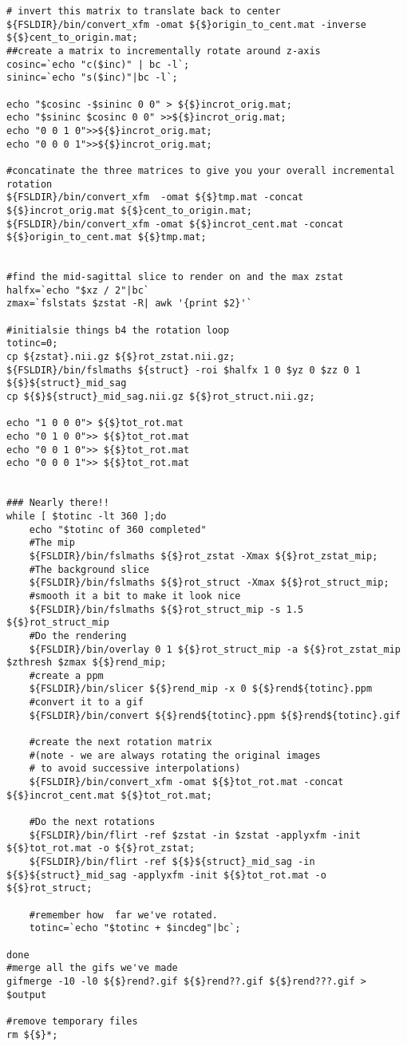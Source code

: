 \documentclass{jsarticle}
\begin{document}
\begin{verbatim}
# invert this matrix to translate back to center
${FSLDIR}/bin/convert_xfm -omat ${$}origin_to_cent.mat -inverse ${$}cent_to_origin.mat;
##create a matrix to incrementally rotate around z-axis
cosinc=`echo "c($inc)" | bc -l`;
sininc=`echo "s($inc)"|bc -l`;

echo "$cosinc -$sininc 0 0" > ${$}incrot_orig.mat;
echo "$sininc $cosinc 0 0" >>${$}incrot_orig.mat;
echo "0 0 1 0">>${$}incrot_orig.mat;
echo "0 0 0 1">>${$}incrot_orig.mat;

#concatinate the three matrices to give you your overall incremental rotation
${FSLDIR}/bin/convert_xfm  -omat ${$}tmp.mat -concat ${$}incrot_orig.mat ${$}cent_to_origin.mat;
${FSLDIR}/bin/convert_xfm -omat ${$}incrot_cent.mat -concat ${$}origin_to_cent.mat ${$}tmp.mat;


#find the mid-sagittal slice to render on and the max zstat
halfx=`echo "$xz / 2"|bc`
zmax=`fslstats $zstat -R| awk '{print $2}'`

#initialsie things b4 the rotation loop
totinc=0;
cp ${zstat}.nii.gz ${$}rot_zstat.nii.gz;
${FSLDIR}/bin/fslmaths ${struct} -roi $halfx 1 0 $yz 0 $zz 0 1 ${$}${struct}_mid_sag
cp ${$}${struct}_mid_sag.nii.gz ${$}rot_struct.nii.gz;

echo "1 0 0 0"> ${$}tot_rot.mat
echo "0 1 0 0">> ${$}tot_rot.mat
echo "0 0 1 0">> ${$}tot_rot.mat
echo "0 0 0 1">> ${$}tot_rot.mat


### Nearly there!!
while [ $totinc -lt 360 ];do
    echo "$totinc of 360 completed" 
    #The mip
    ${FSLDIR}/bin/fslmaths ${$}rot_zstat -Xmax ${$}rot_zstat_mip; 
    #The background slice
    ${FSLDIR}/bin/fslmaths ${$}rot_struct -Xmax ${$}rot_struct_mip;
    #smooth it a bit to make it look nice 
    ${FSLDIR}/bin/fslmaths ${$}rot_struct_mip -s 1.5 ${$}rot_struct_mip
    #Do the rendering
    ${FSLDIR}/bin/overlay 0 1 ${$}rot_struct_mip -a ${$}rot_zstat_mip $zthresh $zmax ${$}rend_mip;
    #create a ppm
    ${FSLDIR}/bin/slicer ${$}rend_mip -x 0 ${$}rend${totinc}.ppm 
    #convert it to a gif
    ${FSLDIR}/bin/convert ${$}rend${totinc}.ppm ${$}rend${totinc}.gif
    
    #create the next rotation matrix 
    #(note - we are always rotating the original images 
    # to avoid successive interpolations)
    ${FSLDIR}/bin/convert_xfm -omat ${$}tot_rot.mat -concat ${$}incrot_cent.mat ${$}tot_rot.mat;
    
    #Do the next rotations
    ${FSLDIR}/bin/flirt -ref $zstat -in $zstat -applyxfm -init ${$}tot_rot.mat -o ${$}rot_zstat; 
    ${FSLDIR}/bin/flirt -ref ${$}${struct}_mid_sag -in ${$}${struct}_mid_sag -applyxfm -init ${$}tot_rot.mat -o ${$}rot_struct;
    
    #remember how  far we've rotated.
    totinc=`echo "$totinc + $incdeg"|bc`; 
   
done 
#merge all the gifs we've made
gifmerge -10 -l0 ${$}rend?.gif ${$}rend??.gif ${$}rend???.gif > $output

#remove temporary files
rm ${$}*;
\end{verbatim}
\end{document}
